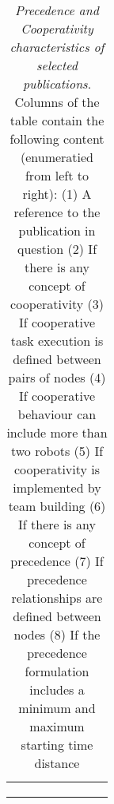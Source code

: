 \begin{table}[t]
\begin{tabular*}{\textwidth}{@{\extracolsep{\fill}}lccccccc}
		\cite{taoMetaheuristicAlgorithmTransporter2019} & 
			\yes & 
			\yes & 
			\yes & 
			 & 
			\yes & 
			\yes & 
			 \\
		\cite{firatImprovedMIPbasedApproach2012} & 
			\yes & 
			 & 
			\yes & 
			\yes & 
			\yes & 
			\yes & 
 			 \\
		\cite{pereiraMultiperiodWorkforceScheduling2020} & 
			\yes & 
			 & 
			 & 
			 & 
			\yes & 
			\yes & 
			 \\
		\bottomrule
	\end{tabular*} 
	\caption[Precedence and Cooperativity characteristics of selected publications]{%
		\label{tab:coop-prec-compare}\textit{Precedence and Cooperativity characteristics of selected publications}. %
		Columns of the table contain the following content (enumeratied from left to right): (1) A reference to the publication in question (2) If there is any concept of cooperativity (3) If cooperative task execution is defined between pairs of nodes (4) If cooperative behaviour can include more than two robots (5) If cooperativity is implemented by team building (6) If there is any concept of precedence (7) If precedence relationships are defined between nodes (8) If the precedence formulation includes a minimum and maximum starting time distance %
		}%
\end{table}
